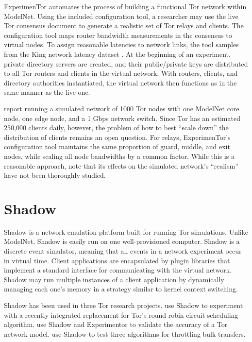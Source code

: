 ExperimenTor automates the process of building a functional Tor network within ModelNet. Using the included configuration tool, a researcher may use the live Tor consensus document to generate a realistic set of Tor relays and clients. The configuration tool maps router bandwidth measurements in the consensus to virtual nodes. To assign reasonable latencies to network links, the tool samples from the King network latency dataset \citep{king}. At the beginning of an experiment, private directory servers are created, and their public/private keys are distributed to all Tor routers and clients in the virtual network. With routers, clients, and directory authorities instantiated, the virtual network then functions as in the same manner as the live one.

\citet{exptorwpaper} report running a simulated network of 1000 Tor nodes with one ModelNet core node, one edge node, and a 1 Gbps network switch. Since Tor has an estimated 250,000 clients daily, however, the problem of how to best ``scale down'' the distribution of clients remains an open question. For relays, ExperimenTor's configuration tool maintains the same proportion of guard, middle, and exit nodes, while scaling all node bandwidths by a common factor. While this is a reasonable approach, \citet{exptorwpaper} note that its effects on the simulated network's ``realism'' have not been thoroughly studied.


\section{Shadow}
Shadow \citep{shadowwpaper} is a network emulation platform built for running Tor simulations. Unlike ModelNet, Shadow is easily run on one well-provisioned computer. Shadow is a discrete event simulator, meaning that all events in a network experiment occur in virtual time. Client applications are encapsulated by plugin libraries that implement a standard interface for communicating with the virtual network. Shadow may run multiple instances of a client application by dynamically managing each one's memory in a strategy similar to kernel context switching.

Shadow has been used in three Tor research projects. \citet{shadowwpaper} use Shadow to experiment with a recently integrated replacement for Tor's round-robin circuit scheduling algorithm. \citet{methmodelnetwork} use Shadow and Experimentor to validate the accuracy of a Tor network model. \citet{throttleparas} use Shadow to test three algorithms for throttling bulk transfers.

